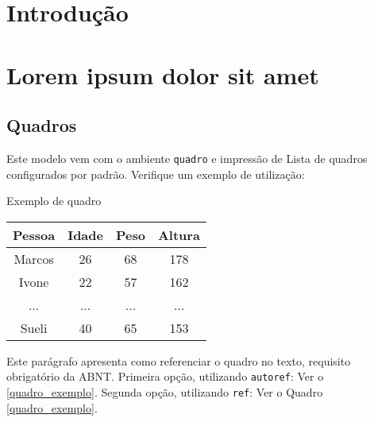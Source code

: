 \chapter{Introdução}




\chapter{Lorem ipsum dolor sit amet}
\label{chap:lorem-ipsum}

\section{Quadros}

Este modelo vem com o ambiente \texttt{quadro} e impressão de Lista de
quadros configurados por padrão. Verifique um exemplo de utilização:

\begin{quadro}[htb]
  \caption{\label{quadro_exemplo}Exemplo de quadro}
  \begin{tabular}{|c|c|c|c|}
    \hline
    \textbf{Pessoa} & \textbf{Idade} & \textbf{Peso} & \textbf{Altura} \\ \hline
    Marcos & 26    & 68   & 178    \\ \hline
    Ivone  & 22    & 57   & 162    \\ \hline
    ...    & ...   & ...  & ...    \\ \hline
    Sueli  & 40    & 65   & 153    \\ \hline
  \end{tabular}
\end{quadro}

Este parágrafo apresenta como referenciar o quadro no texto, requisito
obrigatório da ABNT.
Primeira opção, utilizando \texttt{autoref}: Ver o \autoref{quadro_exemplo}.
Segunda opção, utilizando  \texttt{ref}: Ver o Quadro \ref{quadro_exemplo}.

